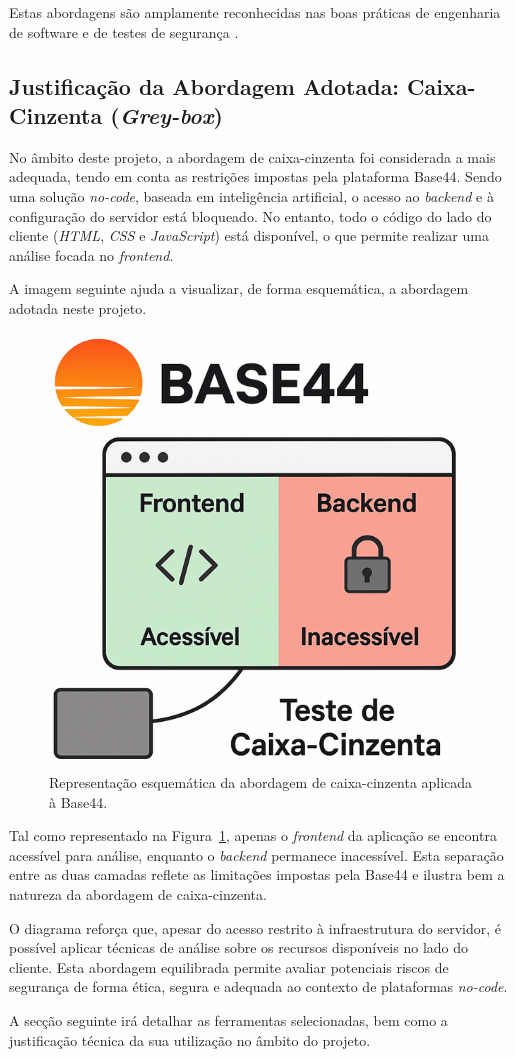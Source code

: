 Estas abordagens são amplamente reconhecidas nas boas práticas de engenharia de software e de testes de segurança \cite{ref37}.

\subsection{Justificação da Abordagem Adotada: Caixa-Cinzenta (\textit{Grey-box})}

No âmbito deste projeto, a abordagem de caixa-cinzenta foi considerada a mais adequada, tendo em conta as restrições impostas pela plataforma Base44. Sendo uma solução \textit{no-code}, baseada em inteligência artificial, o acesso ao \textit{backend} e à configuração do servidor está bloqueado. No entanto, todo o código do lado do cliente (\textit{HTML}, \textit{CSS} e \textit{JavaScript}) está disponível, o que permite realizar uma análise focada no \textit{frontend}.

A imagem seguinte ajuda a visualizar, de forma esquemática, a abordagem adotada neste projeto.

\begin{figure}
    \centering
    \includegraphics[width=0.4\linewidth]{imagens/diagrama.png}
    \caption{Representação esquemática da abordagem de caixa-cinzenta aplicada à Base44.}
    \label{fig:modelo_base44}
\end{figure}

Tal como representado na Figura~\ref{fig:modelo_base44}, apenas o \textit{frontend} da aplicação se encontra acessível para análise, enquanto o \textit{backend} permanece inacessível. Esta separação entre as duas camadas reflete as limitações impostas pela Base44 e ilustra bem a natureza da abordagem de caixa-cinzenta.

O diagrama reforça que, apesar do acesso restrito à infraestrutura do servidor, é possível aplicar técnicas de análise sobre os recursos disponíveis no lado do cliente. Esta abordagem equilibrada permite avaliar potenciais riscos de segurança de forma ética, segura e adequada ao contexto de plataformas \textit{no-code}.

A secção seguinte irá detalhar as ferramentas selecionadas, bem como a justificação técnica da sua utilização no âmbito do projeto.
